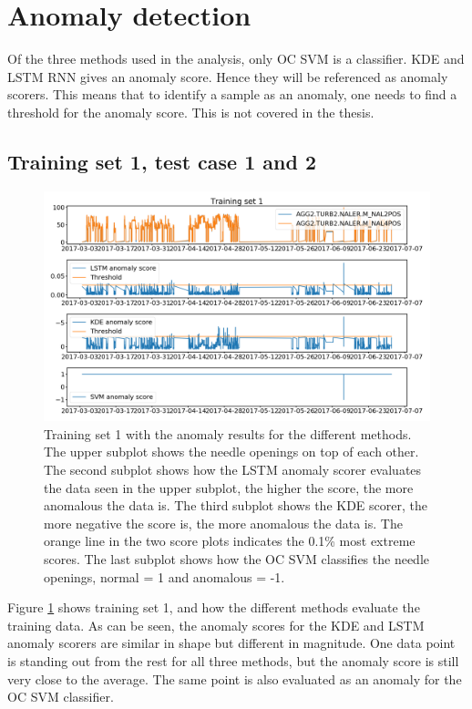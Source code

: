     \section{Anomaly detection}
        Of the three methods used in the analysis, only OC SVM is a classifier. KDE and LSTM RNN gives an anomaly score. Hence they will be referenced as anomaly scorers. This means that to identify a sample as an anomaly, one needs to find a threshold for the anomaly score. This is not covered in the thesis.
        
    \subsection{Training set 1, test case 1 and 2}
        \begin{figure}
            \centering
            \includegraphics[width=\textwidth]{report/figures/analysis/plant1_training/training_data_anomaly.png}
            \caption{Training set 1 with the anomaly results for the different methods. The upper subplot shows the needle openings on top of each other. The second subplot shows how the LSTM anomaly scorer evaluates the data seen in the upper subplot, the higher the score, the more anomalous the data is. The third subplot shows the KDE scorer, the more negative the score is, the more anomalous the data is. The orange line in the two score plots indicates the 0.1\% most extreme scores. The last subplot shows how the OC SVM classifies the needle openings, normal = 1 and anomalous = -1.}
            \label{fig:anomaly_training_set1}
        \end{figure}
        Figure \ref{fig:anomaly_training_set1} shows training set 1, and how the different methods evaluate the training data. As can be seen, the anomaly scores for the KDE and LSTM anomaly scorers are similar in shape but different in magnitude. One data point is standing out from the rest for all three methods, but the anomaly score is still very close to the average. The same point is also evaluated as an anomaly for the OC SVM classifier.
        
